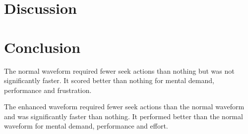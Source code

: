 


\section{Discussion}

\section{Conclusion}
The normal waveform required fewer seek actions than nothing but was not significantly faster. It scored better than
nothing for mental demand, performance and frustration.

The enhanced waveform required fewer seek actions than the normal waveform and was significantly faster than nothing.
It performed better than the normal waveform for mental demand, performance and effort.



